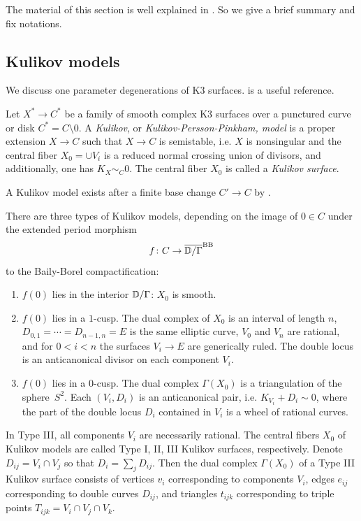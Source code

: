 \documentclass{amsart}
\begin{document}
The material of this section is well explained in
\cite{engel2018looijenga, engel2021smoothings, alexeev2019stable-pair,
  alexeev2021compact}. So we give a brief summary and fix notations.

\subsection{Kulikov models}
\label{sec:kulikov}

We discuss one parameter degenerations of K3 surfaces.
\cite{friedman1986type-III} is a useful reference.

\begin{definition}
  Let $X^*\to C^*$ be a family of smooth complex K3 surfaces over a
  punctured curve or disk $C^* = C\setminus 0$. A {\it Kulikov}, or
  {\it Kulikov-Persson-Pinkham, model} is a proper extension $X\to C$ such that
  $X\to C$ is semistable, i.e. $X$ is nonsingular and the central
  fiber $X_0 = \cup V_i$ is a reduced normal crossing union of
  divisors, and additionally, one has $K_X \sim_C 0$. 
  The central fiber $X_0$ is called a {\it Kulikov surface}.
\end{definition}
A Kulikov model exists after a finite base change $C'\to C$ by
\cite{kulikov1977degenerations-of-k3-surfaces,
  persson1981degeneration-of-surfaces}.

There are three types of Kulikov models, depending on the image of
$0\in C$ under the extended period morphism
$$f\colon C\to \overline{{\mathbb D}/\Gamma}^{\rm BB}$$ to the Baily-Borel
compactification:
\begin{enumerate}
\item[(I)] $f(0)$ lies in the interior ${\mathbb D}/\Gamma$: $X_0$ is smooth.
\item[(II)]
  $f(0)$ lies in a $1$-cusp.
  The dual complex of $X_0$ is an interval of length $n$,
  $D_{0,1} = \dotsb = D_{n-1,n} = E$ is the same elliptic
  curve, $V_0$ and $V_n$ are rational, and for $0<i<n$ the surfaces
  $V_i\to E$ are generically ruled. The double locus
  is an anticanonical divisor on each component $V_i$.
\item [(III)]
  $f(0)$ lies in a $0$-cusp.
  The dual complex $\Gamma(X_0)$ is a triangulation of the
  sphere~$S^2$. Each $(V_i, D_i)$ is an anticanonical pair,
  i.e. $K_{V_i} + D_i\sim 0$, where the part of the double locus $D_i$ contained
  in $V_i$ is a wheel of rational curves. 
\end{enumerate}

In Type III, all components $V_i$ are necessarily rational.
The central fibers $X_0$ of Kulikov models are called Type I, II, III Kulikov
surfaces, respectively. Denote $D_{ij} = V_i\cap V_j$
so that $D_i = \sum_j D_{ij}$. Then the dual complex $\Gamma(X_0)$
of a Type III Kulikov surface consists of vertices $v_i$ corresponding to components $V_i$,
edges $e_{ij}$ corresponding to double curves $D_{ij}$, and triangles $t_{ijk}$ corresponding
to triple points $T_{ijk}=V_i\cap V_j\cap V_k$.
\end{document}
